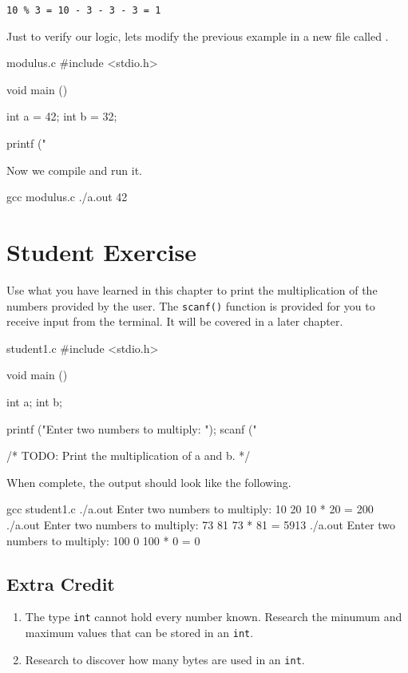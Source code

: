 \begin{center}
\verb|10 % 3 = 10 - 3 - 3 - 3 = 1|
\end{center}

Just to verify our logic, lets modify the previous example in a new file
called .

\begin{code}{modulus.c}
#include <stdio.h>

void main ()
{
    int a = 42;
    int b = 32;

    printf ("%
}
\end{code}

Now we compile  and run it.

\begin{Terminal}
gcc modulus.c
./a.out
42 %
\end{Terminal}

\section{Student Exercise}

Use what you have learned in this chapter to print the multiplication of
the numbers provided by the user. The \verb|scanf()| function is provided for
you to receive input from the terminal. It will be covered in a later chapter.

\begin{code}{student1.c}
#include <stdio.h>

void main ()
{
    int a;
    int b;

    printf ("Enter two numbers to multiply:  ");
    scanf ("%

    /* TODO: Print the multiplication of a and b. */
}
\end{code}

When complete, the output should look like the following.

\begin{Terminal}
gcc student1.c
./a.out
Enter two numbers to multiply:  10 20
10 * 20 = 200
./a.out
Enter two numbers to multiply:  73 81
73 * 81 = 5913
./a.out
Enter two numbers to multiply:  100 0
100 * 0 = 0
\end{Terminal}


\subsection{Extra Credit}

\begin{enumerate}
\item The type \verb|int| cannot hold every number known. Research the minumum
and maximum values that can be stored in an \verb|int|.
\item Research to discover how many bytes are used in an \verb|int|.
\end{enumerate}
